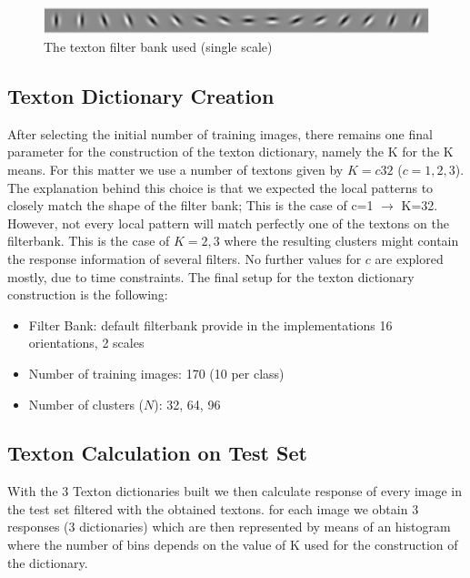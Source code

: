 \documentclass[10pt,twocolumn,letterpaper]{article}
\begin{document}
\begin{figure}

\includegraphics[width=0.95\linewidth]{img/FilterBank.png}
\begin{center}
\caption{The texton filter bank used (single scale)}
\end{center}
\label{fig:FB}
\end{figure}


\subsection{Texton Dictionary Creation}
After selecting the initial number of training images, there remains one final parameter for the construction of the texton dictionary, namely the K for the K means. For this matter we use a number of textons given by $K=c32$ ($c={1,2,3}$). The explanation behind this choice is that we expected the local patterns to closely match the shape of the filter bank; This is the case of c=1 $\rightarrow$ K=32. However, not every local pattern will match perfectly one of the textons on the filterbank. This is the case of $K={2,3}$ where the resulting clusters might contain the response information of several filters. No further values for $c$ are explored mostly, due to time constraints.
The final setup for the texton dictionary construction is the following:

\begin{itemize}
	\item Filter Bank: default filterbank provide in the implementations 16 orientations, 2 scales
	\item Number of training images: 170 (10 per class)
	\item Number of clusters ($N$):  32, 64, 96
\end{itemize}

\subsection{Texton Calculation on Test Set}

With the 3 Texton dictionaries built we then calculate response of every image in the test set filtered with the obtained textons. for each image we obtain 3 responses (3 dictionaries) which are then represented by means of an histogram where the number of bins depends on the value of K used for the construction of the dictionary.
\end{document}
